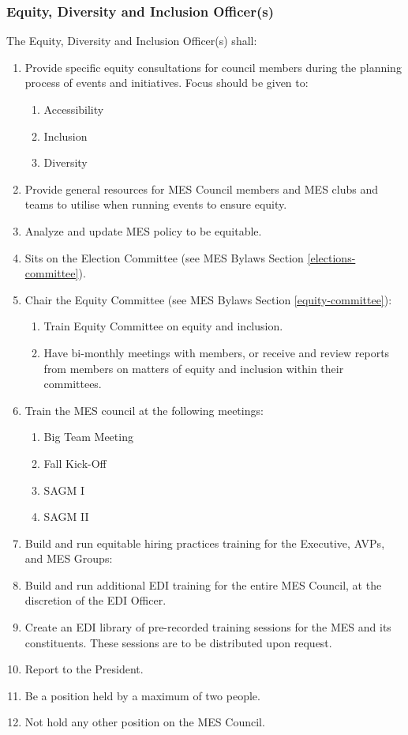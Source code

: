 \subsubsection{Equity, Diversity and Inclusion
  Officer(s)}
\label{equity-diversity-and-inclusion-officers}
The Equity, Diversity and Inclusion Officer(s) shall:

\begin{enumerate}
 \item
  Provide specific equity consultations for council members during the
  planning process of events and initiatives. Focus should be given to:

  \begin{enumerate}
   \item
    Accessibility
   \item
    Inclusion
   \item
    Diversity
  \end{enumerate}
 \item
  Provide general resources for MES Council members and MES clubs and
  teams to utilise when running events to ensure equity.
 \item
  Analyze and update MES policy to be equitable.
 \item
  Sits on the Election Committee (see MES Bylaws Section \ref{elections-committee}).
 \item
  Chair the Equity Committee (see MES Bylaws Section \ref{equity-committee}):

  \begin{enumerate}
   \item
    Train Equity Committee on equity and inclusion.
   \item
    Have bi-monthly meetings with members, or receive and review reports
    from members on matters of equity and inclusion within their
    committees.
  \end{enumerate}
 \item
  Train the MES council at the following meetings:

  \begin{enumerate}
   \item
    Big Team Meeting
   \item
    Fall Kick-Off
   \item
    SAGM I
   \item
    SAGM II
  \end{enumerate}
 \item
  Build and run equitable hiring practices training for the Executive,
  AVPs, and MES Groups:
 \item
  Build and run additional EDI training for the entire MES Council, at
  the discretion of the EDI Officer.
 \item
  Create an EDI library of pre-recorded training sessions for the MES
  and its constituents. These sessions are to be distributed upon
  request.
 \item
  Report to the President.
 \item
  Be a position held by a maximum of two people.
 \item
  Not hold any other position on the MES Council.

\end{enumerate}

